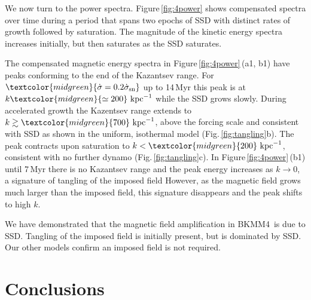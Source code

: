 \documentclass[preprint2]{aastex63}
\newcommand\SNr{\dot\sigma_{\rm sn}}
\newcommand\kpc{~ {\rm kpc}}
\newcommand\dx{ {\delta x}}
\newcommand\BKM{{\sf BKMM4}}
\newcommand{\fg}[1]{\textcolor{midgreen}{#1}}
\newcommand{\mm}[1]{\textcolor{mypurple}{#1}}
\begin{document}
\mm{We now turn to the power spectra. Figure\,\ref{fig:4power} shows
  compensated spectra over time during a period that }
\fg{
  spans two epochs of SSD with distinct rates of growth 
  followed by saturation.
      \mm{The}
  magnitude of the kinetic energy spectra \mm{increases
  initially, but then saturates as the SSD saturates.} }
  
The compensated magnetic energy spectra in Figure\,\ref{fig:4power}\,(a1, b1)
 have \fg{peaks conforming to the end of the Kazantsev range.
 For $\fg{\dot\sigma=0.2\SNr}$ up to 14\,Myr this peak is at
 $k\fg{\simeq200}\kpc^{-1}$ while the
 SSD grows \mm{slowly}.
 During accelerated growth the Kazentsev range extends to}
 $k\gtrsim\fg{700}\kpc^{-1}$, above the forcing scale and consistent
 with SSD \mm{as shown in the uniform, isothermal model}
 (Fig.\,\ref{fig:tangling}b).
 The peak contracts upon saturation to $k<\fg{200}\kpc^{-1}$, consistent with no
 \mm{further} dynamo (Fig.\,\ref{fig:tangling}c).
 In Figure\,\ref{fig:4power}\,(b1) \fg{until 7\,Myr there is no Kazantsev range
 and the peak energy increases as $k\rightarrow0$, a signature of tangling of
 the imposed field
 However, as the magnetic field grows much larger than the imposed field,
 this signature disappears and the peak shifts to high $k$.}
 
 \fg{We have demonstrated that the magnetic field amplification in \BKM\ is
 due to SSD. 
 Tangling of the imposed field is \mm{initially} present, but is
 dominated by SSD. \mm{O}ur other models 
 confirm an imposed field is not required.
 }

\section{Conclusions}\label{sec:conc}
\end{document}
